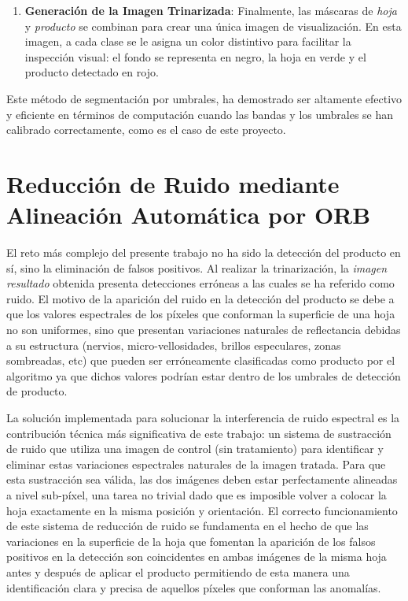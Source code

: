 \begin{enumerate}
    \item \textbf{Generación de la Imagen Trinarizada}: Finalmente, las máscaras de \textit{hoja} y \textit{producto} se combinan para crear una única imagen de visualización. En esta imagen, a cada clase se le asigna un color distintivo para facilitar la inspección visual: el fondo se representa en negro, la hoja en verde y el producto detectado en rojo.
\end{enumerate}
Este método de segmentación por umbrales, ha demostrado ser altamente efectivo y eficiente en términos de computación cuando las bandas y los umbrales se han calibrado correctamente, como es el caso de este proyecto.

\section{Reducción de Ruido mediante Alineación Automática por ORB}

El reto más complejo del presente trabajo no ha sido la detección del producto en sí, sino la eliminación de falsos positivos. Al realizar la trinarización, la \textit{imagen resultado} obtenida presenta detecciones erróneas a las cuales se ha referido como ruido. El motivo de la aparición del ruido en la detección del producto se debe a que los valores espectrales de los píxeles que conforman la superficie de una hoja no son uniformes, sino que  presentan variaciones naturales de reflectancia debidas a su estructura (nervios, micro-vellosidades, brillos especulares, zonas sombreadas, etc) que pueden ser erróneamente clasificadas como producto por el algoritmo ya que dichos valores podrían estar dentro de los umbrales de detección de producto.

La solución implementada para solucionar la interferencia de ruido espectral es la contribución técnica más significativa de este trabajo: un sistema de sustracción de ruido que utiliza una imagen de control (sin tratamiento) para identificar y eliminar estas variaciones espectrales naturales de la imagen tratada. Para que esta sustracción sea válida, las dos imágenes deben estar perfectamente alineadas a nivel sub-píxel, una tarea no trivial dado que es imposible volver a colocar la hoja exactamente en la misma posición y orientación. El correcto funcionamiento de este sistema de reducción de ruido se fundamenta en el hecho de que las variaciones en la superficie de la hoja que fomentan la aparición de los falsos positivos en la detección son coincidentes en ambas imágenes de la misma hoja antes y después de aplicar el producto permitiendo de esta manera una identificación clara y precisa de aquellos píxeles que conforman las anomalías.

